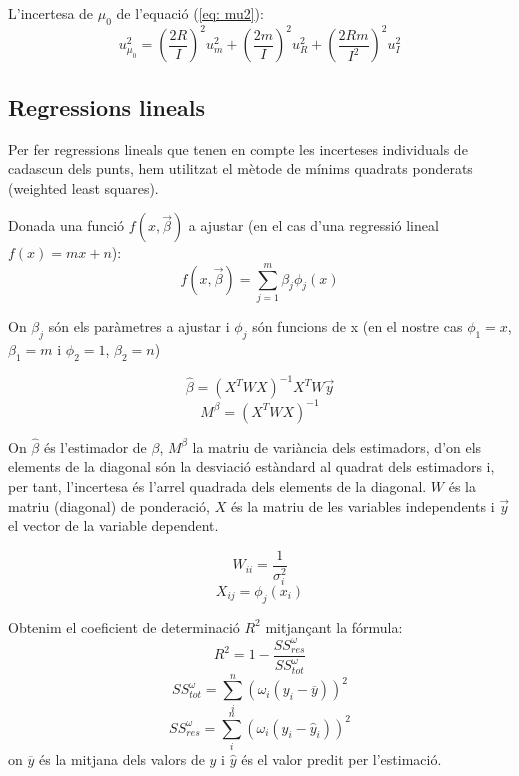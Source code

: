 \documentclass[11pt]{article}
\numberwithin{equation}{section}
\numberwithin{figure}{section}
\numberwithin{table}{section}
\begin{document}
L'incertesa de $\mu_0$ de l'equació (\ref{eq: mu2}):
\begin{equation}
    u_{\mu_0}^2 = \left(\frac{2R}{I}\right)^2u_m^2 + \left(\frac{2m}{I}\right)^2u_R^2 + \left(\frac{2Rm}{I^2}\right)^2u_I^2
\end{equation}

\subsection{Regressions lineals} \label{sec: Ap_Regr}
Per fer regressions lineals que tenen en compte les incerteses individuals de cadascun dels punts, hem utilitzat el mètode de mínims quadrats ponderats (weighted least squares).
 
 Donada una funció $f(x,\vec{\beta})$ a ajustar (en el cas d'una regressió lineal $f(x) = mx+n$):
 \begin{equation}
     f(x,\vec{\beta}) = \sum_{j=1}^m\beta_j\phi_j(x)
 \end{equation}
 
  On ${\beta_j}$ són els paràmetres a ajustar i $\phi_j$ són funcions de x (en el nostre cas $\phi_1 = x$, $\beta_1 = m$ i $\phi_2 = 1$, $\beta_2 = n$)
 
 \begin{equation}
     \hat{\beta} = (X^TWX)^{-1}X^TW\vec{y}
 \end{equation}
 \begin{equation}
     M^\beta = (X^TWX)^{-1}
 \end{equation}
 
 On $\hat{\beta}$ és l'estimador de $\beta$, $M^\beta$ la matriu de variància dels estimadors, d'on els elements de la diagonal són la desviació estàndard al quadrat dels estimadors i, per tant, l'incertesa és l'arrel quadrada dels elements de la diagonal. $W$ és la matriu (diagonal) de ponderació, $X$ és la matriu de les variables independents i $\vec{y}$ el vector de la variable dependent.
 
 \begin{equation}
     W_{ii} = \frac{1}{\sigma_i^2}
 \end{equation}
 \begin{equation}
     X_{ij} = \phi_j(x_i)
 \end{equation}

Obtenim el coeficient de determinació $R^2$ mitjançant la fórmula:
\begin{equation}
    R^2 = 1 - \frac{SS_{res}^\omega}{SS_{tot}^\omega}
\end{equation}
\begin{equation}
    SS_{tot}^\omega = \sum^n_{i}(\omega_i(y_i-\overline{y}))^2
\end{equation}
\begin{equation}
    SS_{res}^\omega = \sum^n_{i}(\omega_i(y_i-\hat{y}_i))^2
\end{equation}
on $\overline{y}$ és la mitjana dels valors de $y$ i $\hat{y}$ és el valor predit per l'estimació.
\end{document}
